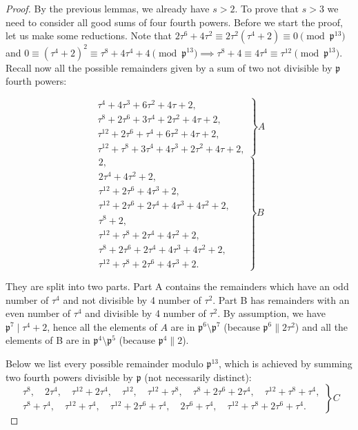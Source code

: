 \documentclass[12pt]{article}
\theoremstyle{remark}
\begin{document}
\begin{proof} By the previous lemmas, we already have $s>2$. To prove that $s > 3$ we need to consider all good sums of four fourth powers. Before we start the proof, let us make some reductions. Note that $2\tau^6 + 4\tau^2 \equiv 2\tau^2(\tau^4+2) \equiv 0 \pmod{\mathfrak{p}^{13}}$ and $0 \equiv (\tau^4+2)^2 \equiv \tau^8 + 4\tau^4+4 \pmod{\mathfrak{p}^{13}} \implies \tau^8+4 \equiv 4\tau^{4} \equiv\tau^{12}\pmod{\mathfrak{p}^{13}}$. Recall  now all the possible remainders given by a sum of two not divisible by $\mathfrak{p}$ fourth powers: 

$$
\left.
    \begin{array}{ll}
        \tau^4 + 4\tau^3 + 6\tau^2 + 4\tau +2, \\
        \tau^8 + 2\tau^6 + 3\tau^4 + 2\tau^2 + 4\tau + 2  , \\
        \tau^{12} + 2\tau^6 + \tau^4 + 6\tau^2 + 4\tau +2, \\
        \tau^{12}+\tau^8+3\tau^4+4\tau^3+2\tau^2+4\tau+2, 
    \end{array}
\right \}A 
$$
$$
\left.
    \begin{array}{ll}
        2,\\
        2\tau^4+4\tau^2+2,\\
        \tau^{12} + 2\tau^6 + 4\tau^3 + 2, \\
        \tau^{12}+ 2\tau^6 + 2\tau^4 + 4\tau^3 + 4\tau^2 + 2, \quad \ \   \\
        \tau^8 + 2, \\
        \tau^{12}+\tau^8+2\tau^4+4\tau^2+2, \\
        \tau^8+2\tau^6+2\tau^4+4\tau^3+4\tau^2+2,  \\
        \tau^{12}+\tau^8+2\tau^6+4\tau^3+2. 
    \end{array}
\right \}B
$$

They are split into two parts. Part A contains the remainders which have an odd number of $\tau^4$ and not divisible by 4 number of $\tau^2$. Part B has remainders with an even number of $\tau^4$ and divisible by 4 number of $\tau^2$. By assumption, we have $\mathfrak{p}^7 \mid \tau^4+2$, hence all the elements of $A$ are in $\mathfrak{p}^6\setminus \mathfrak{p}^7$ (because $\mathfrak{p}^6 \parallel 2\tau^2$) and all the elements of B are in $\mathfrak{p}^4\setminus \mathfrak{p}^5$ (because $\mathfrak{p}^4 \parallel 2$).


Below we list every possible remainder modulo $\mathfrak{p}^{13}$, which is achieved by summing two fourth powers divisible by $\mathfrak{p}$ (not necessarily distinct):
$$
\left.
    \begin{array}{ll}
        \tau^8, \quad 2\tau^4, \quad \tau^{12}+2\tau^4, \quad \tau^{12}, \quad \tau^{12}+\tau^8, \quad  \tau^8 + 2\tau^6 + 2\tau^4, \quad \tau^{12}+\tau^8+\tau^4, \\ 
     \tau^8 + \tau^4, \quad \tau^{12}+\tau^4, \quad \tau^{12}+2\tau^6 + \tau^4, \quad 2\tau^6 + \tau^4, \quad \tau^{12}+\tau^8+2\tau^6+\tau^4. 
    \end{array}
\right \}C
$$


\end{proof}
\end{document}
